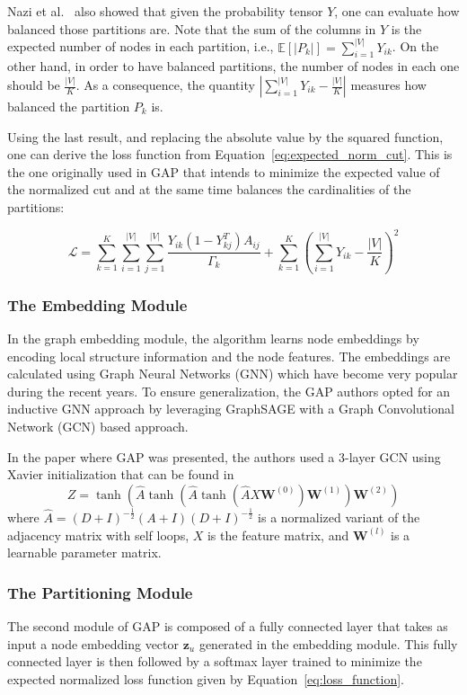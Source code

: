 Nazi et al.~\cite{gap} also showed that given the probability tensor $Y$, one can evaluate how balanced those partitions are.
Note that the sum of the columns in $Y$ is the expected number of nodes in each partition, i.e., $\mathbb{E}[|P_k|]=\sum_{i=1}^{|V|}Y_{ik}$. On the other hand, in order to have balanced partitions, the number of nodes in each one should be $\frac{|V|}{K}$. As a consequence, the quantity $\left|\sum_{i=1}^{|V|}Y_{ik} - \frac{|V|}{K}\right|$ measures how balanced the partition $P_k$ is.

Using the last result, and replacing the absolute value by the squared function, one can derive the loss function from Equation~\ref{eq:expected_norm_cut}. This is the one originally used in GAP that intends to minimize the expected value of the normalized cut and at the same time balances the cardinalities of the partitions:

\begin{equation}
    \label{eq:loss_function}
    \mathcal{L} = \sum_{k=1}^K\sum_{i=1}^{|V|}\sum_{j=1}^{|V|}\frac{Y_{ik}(1-Y_{kj}^T)A_{ij}}{\Gamma_k} + \sum_{k=1}^K\left(\sum_{i=1}^{|V|}Y_{ik} - \frac{|V|}{K}\right)^2
\end{equation}

\subsubsection{The Embedding Module} In the graph embedding module, the algorithm learns node embeddings by encoding local structure information and the node features. The embeddings are calculated using Graph Neural Networks (GNN) which have become very popular during the recent years. To ensure generalization, the GAP authors opted for an inductive GNN approach by leveraging GraphSAGE with a Graph Convolutional Network (GCN) based approach.

In the paper where GAP was presented, the authors used a $3$-layer GCN using Xavier initialization that can be found in~\cite{xavier}
\begin{displaymath}
    Z = \tanh(\hat{A}\tanh(\hat{A}\tanh(\hat{A}X\boldsymbol W^{(0)})\boldsymbol W^{(1)})\boldsymbol W^{(2)})
\end{displaymath}
where $\hat{A} = (D+I)^{-\frac{1}{2}}(A+I)(D+I)^{-\frac{1}{2}}$ is a normalized variant of the adjacency matrix with self loops, $X$ is the feature matrix, and $\boldsymbol W^{(l)}$ is a learnable parameter matrix.

\subsubsection{The Partitioning Module}
The second module of GAP is composed of a fully connected layer that takes as input a node embedding vector $\boldsymbol z_u$ generated in the embedding module. This fully connected layer is then followed by a softmax layer 
trained to minimize the expected normalized loss function given by Equation~\ref{eq:loss_function}.

